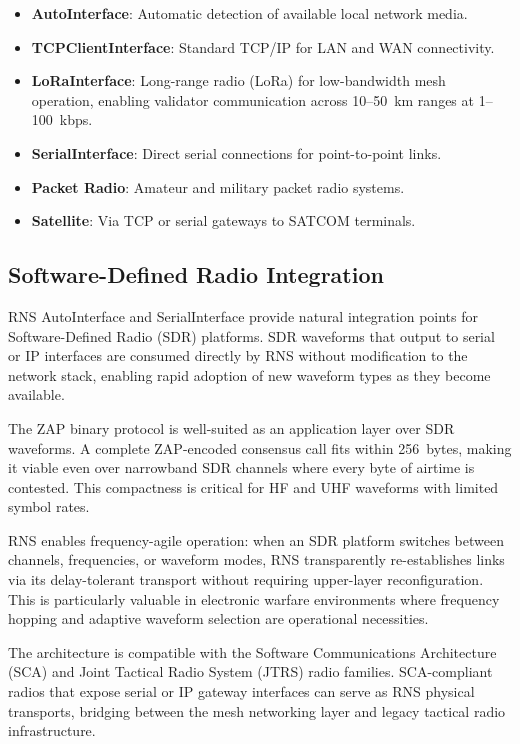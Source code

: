 \documentclass[11pt,letterpaper]{article}
\begin{document}
\begin{itemize}
\item \textbf{AutoInterface}: Automatic detection of available local network media.
\item \textbf{TCPClientInterface}: Standard TCP/IP for LAN and WAN connectivity.
\item \textbf{LoRaInterface}: Long-range radio (LoRa) for low-bandwidth mesh operation, enabling validator communication across 10--50~km ranges at 1--100~kbps.
\item \textbf{SerialInterface}: Direct serial connections for point-to-point links.
\item \textbf{Packet Radio}: Amateur and military packet radio systems.
\item \textbf{Satellite}: Via TCP or serial gateways to SATCOM terminals.
\end{itemize}

\subsection{Software-Defined Radio Integration}

RNS AutoInterface and SerialInterface provide natural integration points for Software-Defined Radio (SDR) platforms. SDR waveforms that output to serial or IP interfaces are consumed directly by RNS without modification to the network stack, enabling rapid adoption of new waveform types as they become available.

The ZAP binary protocol is well-suited as an application layer over SDR waveforms. A complete ZAP-encoded consensus call fits within 256~bytes, making it viable even over narrowband SDR channels where every byte of airtime is contested. This compactness is critical for HF and UHF waveforms with limited symbol rates.

RNS enables frequency-agile operation: when an SDR platform switches between channels, frequencies, or waveform modes, RNS transparently re-establishes links via its delay-tolerant transport without requiring upper-layer reconfiguration. This is particularly valuable in electronic warfare environments where frequency hopping and adaptive waveform selection are operational necessities.

The architecture is compatible with the Software Communications Architecture (SCA) and Joint Tactical Radio System (JTRS) radio families. SCA-compliant radios that expose serial or IP gateway interfaces can serve as RNS physical transports, bridging between the mesh networking layer and legacy tactical radio infrastructure.
\end{document}
